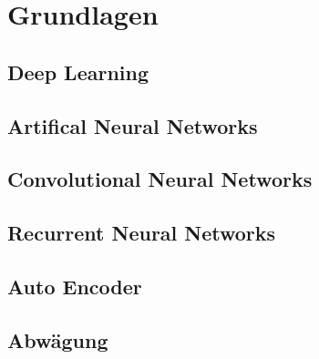 \section{Grundlagen}
\subsection{Deep Learning}
\subsection{Artifical Neural Networks}
\subsection{Convolutional Neural Networks}
\subsection{Recurrent Neural Networks}
\subsection{Auto Encoder}
\subsection{Abwägung}